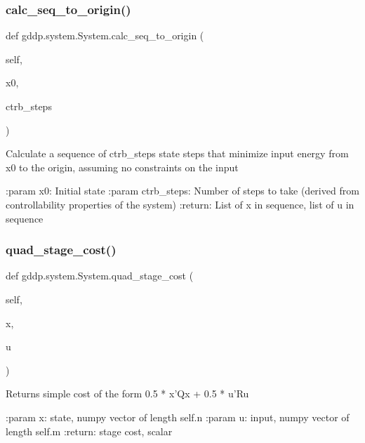 \subsubsection{\texorpdfstring{calc\_seq\_to\_origin()}{calc\_seq\_to\_origin()}}
{\footnotesize\ttfamily def gddp.\+system.\+System.\+calc\+\_\+seq\+\_\+to\+\_\+origin (\begin{DoxyParamCaption}\item[{}]{self,  }\item[{}]{x0,  }\item[{}]{ctrb\+\_\+steps }\end{DoxyParamCaption})}

\begin{DoxyVerb}Calculate a sequence of ctrb_steps state steps that minimize input energy from x0 to the
origin, assuming no constraints on the input

:param x0: Initial state
:param ctrb_steps: Number of steps to take (derived from controllability properties of the
    system)
:return: List of x in sequence, list of u in sequence
\end{DoxyVerb}
 \mbox{\label{classgddp_1_1system_1_1_system_acf956449a60ee65e8b58627074ed56d2}} 
\subsubsection{\texorpdfstring{quad\_stage\_cost()}{quad\_stage\_cost()}}
{\footnotesize\ttfamily def gddp.\+system.\+System.\+quad\+\_\+stage\+\_\+cost (\begin{DoxyParamCaption}\item[{}]{self,  }\item[{}]{x,  }\item[{}]{u }\end{DoxyParamCaption})}

\begin{DoxyVerb}Returns simple cost of the form 0.5 * x'Qx + 0.5 * u'Ru

:param x: state, numpy vector of length self.n
:param u: input, numpy vector of length self.m
:return: stage cost, scalar
\end{DoxyVerb}
 \mbox{\label{classgddp_1_1system_1_1_system_ade878bad851950e1aaff8a2b2ff8d2b8}} 
